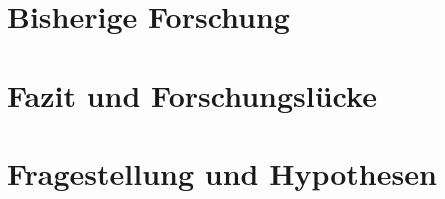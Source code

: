 \section{Bisherige Forschung}\label{section.bisherigeForschung}

\section{Fazit und Forschungslücke}\label{section.fazitLücke}

\section{Fragestellung und Hypothesen}\label{section.fragestellung}




